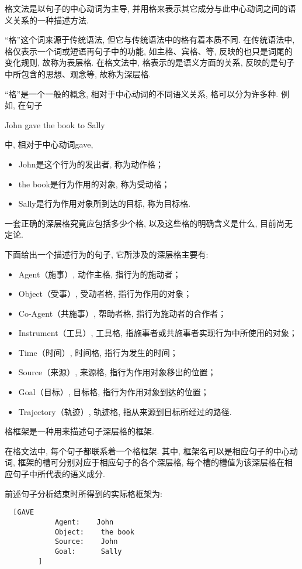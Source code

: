     格文法是以句子的中心动词为主导, 并用格来表示其它成分与此中心动词之间的语义关系的一种描述方法.

“格”这个词来源于传统语法, 但它与传统语法中的格有着本质不同. 在传统语法中, 格仅表示一个词或短语再句子中的功能, 如主格、宾格、等, 反映的也只是词尾的变化规则, 故称为表层格. 在格文法中, 格表示的是语义方面的关系, 反映的是句子中所包含的思想、观念等, 故称为深层格.

“格”是一个一般的概念, 相对于中心动词的不同语义关系, 格可以分为许多种. 例如, 在句子
\begin{center}
  John gave the book to Sally
\end{center}
中, 相对于中心动词gave,

\begin{itemize}
\item John是这个行为的发出者, 称为动作格；
\item the book是行为作用的对象, 称为受动格；
\item Sally是行为作用对象所到达的目标, 称为目标格.
\end{itemize}

 一套正确的深层格究竟应包括多少个格, 以及这些格的明确含义是什么, 目前尚无定论.

下面给出一个描述行为的句子, 它所涉及的深层格主要有:
\begin{itemize}
\item Agent（施事）,  动作主格, 指行为的施动者；
\item Object（受事）, 受动者格, 指行为作用的对象；
\item Co-Agent（共施事）, 帮助者格, 指行为施动者的合作者；
\item Instrument（工具）, 工具格, 指施事者或共施事者实现行为中所使用的对象；
\item Time（时间）,   时间格, 指行为发生的时间；
\item Source（来源）, 来源格, 指行为作用对象移出的位置；
\item Goal（目标）,   目标格, 指行为作用对象到达的位置；
\item Trajectory（轨迹）, 轨迹格, 指从来源到目标所经过的路径.
\end{itemize}

格框架是一种用来描述句子深层格的框架.


在格文法中, 每个句子都联系着一个格框架. 其中, 框架名可以是相应句子的中心动词, 框架的槽可分别对应于相应句子的各个深层格, 每个槽的槽值为该深层格在相应句子中所代表的语义成分.

\begin{example}
前述句子分析结束时所得到的实际格框架为:
\begin{Verbatim}
  [GAVE
            Agent:    John
            Object:    the book
            Source:    John
            Goal:      Sally
        ]
\end{Verbatim}
\end{example}
